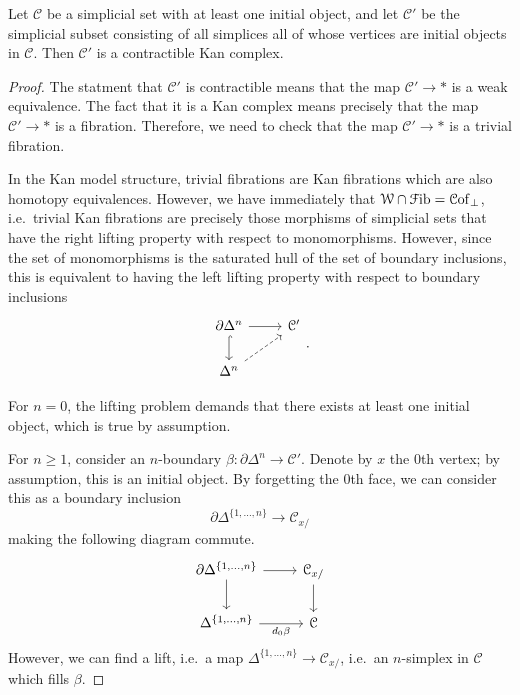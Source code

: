 \documentclass[main.tex]{subfiles}
\begin{document}
\begin{theorem}
  Let $\mathcal{C}$ be a simplicial set with at least one initial object, and let $\mathcal{C}'$ be the simplicial subset consisting of all simplices all of whose vertices are initial objects in $\mathcal{C}$. Then $\mathcal{C}'$ is a contractible Kan complex.
\end{theorem}
\begin{proof}
  The statment that $\mathcal{C}'$ is contractible means that the map $\mathcal{C}' \to *$ is a weak equivalence. The fact that it is a Kan complex means precisely that the map $\mathcal{C}' \to *$ is a fibration. Therefore, we need to check that the map $\mathcal{C}' \to *$ is a trivial fibration. 
  
  In the Kan model structure, trivial fibrations are Kan fibrations which are also homotopy equivalences. However, we have immediately that $\mathcal{W} \cap \mathcal{F}\mathrm{ib} = \mathcal{C}\mathrm{of}_{\perp}$, i.e.\ trivial Kan fibrations are precisely those morphisms of simplicial sets that have the right lifting property with respect to monomorphisms. However, since the set of monomorphisms is the saturated hull of the set of boundary inclusions, this is equivalent to having the left lifting property with respect to boundary inclusions
  \begin{equation*}
    \begin{tikzcd}
      \partial \Delta^{n}
      \arrow[r]
      \arrow[d, hookrightarrow]
      & \mathcal{C'}
      \\
      \Delta^{n}
      \arrow[ur, dashed]
    \end{tikzcd}.
  \end{equation*}

  For $n = 0$, the lifting problem demands that there exists at least one initial object, which is true by assumption.

  For $n \geq 1$, consider an $n$-boundary $\beta\colon \partial \Delta^{n} \to \mathcal{C}'$. Denote by $x$ the 0th vertex; by assumption, this is an initial object. By forgetting the $0$th face, we can consider this as a boundary inclusion
  \begin{equation*}
    \partial \Delta^{\{1, \ldots, n\}} \to \mathcal{C}_{x/}
  \end{equation*}
  making the following diagram commute.
  \begin{equation*}
    \begin{tikzcd}
      \partial \Delta^{\{1, \ldots, n\}}
      \arrow[r]
      \arrow[d]
      & \mathcal{C}_{x/}
      \arrow[d]
      \\
      \Delta^{\{1, \ldots, n\}}
      \arrow[r, swap, "d_{0}\beta"]
      & \mathcal{C}
    \end{tikzcd}
  \end{equation*}
  However, we can find a lift, i.e.\ a map $\Delta^{\{1, \ldots, n\}} \to \mathcal{C}_{x/}$, i.e.\ an $n$-simplex in $\mathcal{C}$ which fills $\beta$.
\end{proof}
\end{document}

